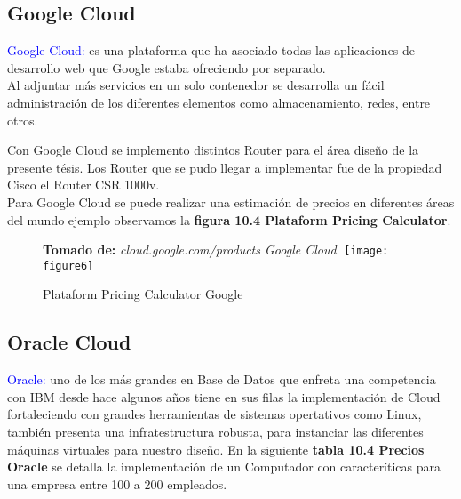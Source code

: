 \subsection{Google Cloud}

\textcolor{blue}{Google Cloud:} es una plataforma que ha asociado todas las aplicaciones de desarrollo web que Google 
estaba ofreciendo por separado.
\\
Al adjuntar más servicios en un solo contenedor se desarrolla un fácil administración de los diferentes elementos como almacenamiento, redes, entre otros.

Con Google Cloud se implemento distintos Router para el área diseño de la presente tésis. Los Router que se pudo llegar a implementar fue de la propiedad Cisco el Router CSR 1000v.
\\
Para Google Cloud se puede realizar una estimación de precios en diferentes áreas del mundo ejemplo observamos la \textbf{figura 10.4 Plataform Pricing Calculator}.

\begin{figure}[htbp]
 \textbf{Tomado de:} \textit{cloud.google.com/products Google Cloud}.
  \centering
  {\texttt{[image: figure6]}}%
  \caption{Plataform Pricing Calculator Google}
  \label{fig:fig2subfig}
\end{figure}

\subsection{Oracle Cloud}

\textcolor{blue}{Oracle:} uno de los más grandes en Base de Datos que enfreta una competencia con IBM desde hace algunos años tiene en sus filas la implementación de Cloud fortaleciendo con grandes herramientas de sistemas opertativos como Linux, también presenta una infratestructura robusta, para instanciar las diferentes máquinas virtuales para nuestro diseño. En la siguiente \textbf{tabla 10.4 Precios Oracle} se detalla la implementación de un Computador con caracteríticas para una empresa entre 100 a 200 empleados.

